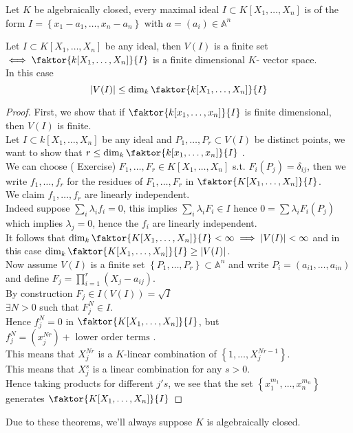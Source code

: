 \documentclass[../main.tex]{subfiles}
\begin{document}
\begin{thm}
	Let $K$ be algebraically closed, every maximal ideal $I \subset K[X_1,\ldots, X_n]$ is of the form $ I= \left\{ x_1-a_1,\ldots, x_n-a_n \right\} $ with $a= ( a_i) \in \mathbb{A}^{n}$ 
\end{thm}
\begin{crly}
	Let $I \subset K[X_1,\ldots, X_n]$ be any ideal, then $V( I) $ is a finite set $\iff \faktor { k[X_1,\ldots, X_n]} { I} $ is a finite dimensional $K$- vector space.\\
	In this case
	\[ 
	|V( I) | \leq \dim_k \faktor { k[X_1,\ldots, X_n]} { I}
	\]
\end{crly}
\begin{proof}
	First, we show that if $ \faktor{k[x_1,\ldots,x_n]}{I}$ is finite dimensional, then $V( I) $ is finite.\\ 
	Let $I \subset k[X_1,\ldots, X_n]$ be any ideal and $P_1, \ldots, P_r \subset V( I) $ be distinct points, we want to show that $ r \leq  \dim_k \faktor{k[x_1,\ldots,x_n]}{I}$  .\\
	We can choose ( Exercise) $F_1,\ldots, F_r \in K[X_1,\ldots, X_n]$ s.t. $F_i( P_j) = \delta_{ij} $, then we write $f_1,\ldots, f_r$ for the residues of $F_1,\ldots, F_r$ in $\faktor{  K[X_1,\ldots, X_n] } { I} $.\\
	We claim $f_1,\ldots, f_r$ are linearly independent.\\
	Indeed suppose $\sum_i \lambda_i f_i = 0$, this implies $ \sum_i \lambda_i F_i \in I$ hence $0 = \sum \lambda_i F_i( P_j) $ which implies $\lambda_j = 0 $, hence the $f_i$ are linearly independent.\\
	It follows that $\dim_k \faktor{  K[X_1,\ldots, X_n] } { I} < \infty \implies |V( I) | < \infty $ and in this case $\dim_k \faktor{  K[X_1,\ldots, X_n] } { I} \geq |V( I) |$.\\
	Now assume $V( I) $ is a finite set $ \left\{ P_1,\ldots, P_r \right\} \subset \mathbb{A}^{n}$ and write $P_i = ( a_{i1}, \ldots, a_{in}  ) $ and define $F_j= \prod_{i =1}^{r}( X_j- a_{ij} ) $.\\
	By construction $F_j\in I( V( I) )= \sqrt{I}  $\\
	$\exists N>0$ such that $F_j^{N}\in I$.\\
	Hence $f_j^{N}=0$ in $\faktor{  K[X_1,\ldots, X_n] } { I} $, but $f_j^{N}= ( x_j^{Nr}) +  \text{ lower order terms } 	$.\\
	This means that $X_j^{Nr}$ is a $K$-linear combination of $ \left\{ 1,\ldots, X_j^{Nr-1} \right\} $.\\
	This means that $X_j^{s}$ is a linear combination for any $s>0$.\\
	Hence taking products for different $j's$, we see that the set $ \left\{ x_1^{m_1},\ldots, x_n^{m_n} \right\} $ generates $ \faktor{  K[X_1,\ldots, X_n] } { I}$ 
\end{proof}
Due to these theorems, we'll always suppose $K$ is algebraically closed.






		
\end{document}
